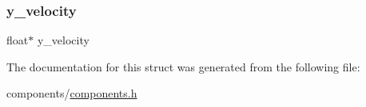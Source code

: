 \subsubsection{\texorpdfstring{y\+\_\+velocity}{y\_velocity}}
{\footnotesize\ttfamily float$\ast$ y\+\_\+velocity}



The documentation for this struct was generated from the following file\+:\begin{DoxyCompactItemize}
\item 
components/\mbox{\hyperlink{components_8h}{components.\+h}}\end{DoxyCompactItemize}
